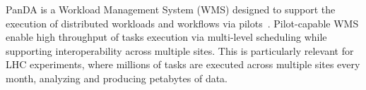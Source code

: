 PanDA is a Workload Management System (WMS)%
designed to support the execution of distributed workloads and workflows via
pilots~\cite{turilli2015comprehensive}. Pilot-capable WMS enable high
throughput of tasks execution via multi-level scheduling while supporting
interoperability across multiple sites. This is particularly relevant for LHC
experiments, where millions of tasks are executed across multiple sites every
month, analyzing and producing petabytes of data. 






